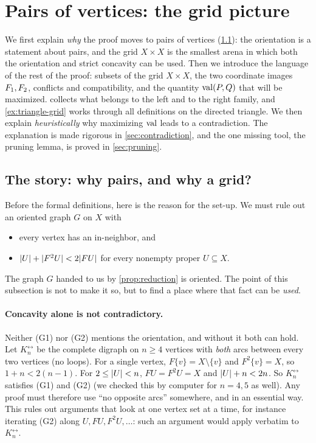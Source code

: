 \section{Pairs of vertices: the grid picture}\label{sec:pairs}

\begin{idea}
We first explain \emph{why} the proof moves to pairs of vertices
(\cref{sec:story}): the orientation is a statement about pairs, and the
grid $X\times X$ is the smallest arena in which both the orientation and
strict concavity can be used. Then we introduce the language of the rest of
the proof: subsets of the grid
$X\times X$, the two coordinate images $F_1,F_2$, conflicts and compatibility,
and the quantity $\operatorname{val}(P,Q)$ that will be maximized. 
collects what belongs to the left and to the right family, and
\cref{ex:triangle-grid} works through all definitions on the directed
triangle. We then explain
\emph{heuristically} why maximizing $\operatorname{val}$ leads to a contradiction. The
explanation is made rigorous in \cref{sec:contradiction}, and the one
missing tool, the pruning lemma, is proved in \cref{sec:pruning}.
\end{idea}

\subsection{The story: why pairs, and why a grid?}\label{sec:story}

Before the formal definitions, here is the reason for the set-up. We must
rule out an oriented graph $G$ on $X$ with
\begin{itemize}[leftmargin=*]
\item[(G1)] every vertex has an in-neighbor, and
\item[(G2)] $\lvert U\rvert+\lvert F^2U\rvert<2\lvert FU\rvert$ for every nonempty proper $U\subseteq X$.
\end{itemize}

The graph $G$ handed to us by \cref{prop:reduction} is oriented. The point
of this subsection is not to make it so, but to find a place where that
fact can be \emph{used}.

\paragraph{Concavity alone is not contradictory.}
Neither (G1) nor (G2) mentions the orientation, and without it both
can hold. Let $K_n^{\leftrightarrow}$ be the complete digraph on $n\ge4$
vertices with \emph{both} arcs between every two vertices (no loops). For a
single vertex, $F\{v\}=X\setminus\{v\}$ and $F^2\{v\}=X$, so
$1+n<2(n-1)$. For $2\le\lvert U\rvert<n$, $FU=F^2U=X$ and $\lvert U\rvert+n<2n$. So
$K_n^{\leftrightarrow}$ satisfies (G1) and (G2) (we checked this by computer
for $n=4,5$ as well). Any proof must therefore use ``no opposite arcs''
somewhere, and in an essential way. This rules out arguments that look at one
vertex set at a time, for instance iterating (G2) along $U,FU,F^2U,\dots$:
such an argument would apply verbatim to $K_n^{\leftrightarrow}$.

